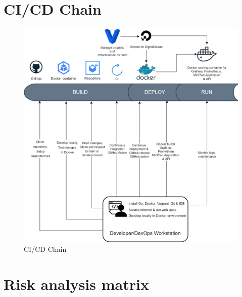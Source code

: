 \appendix

\section{CI/CD Chain}
\label{app:cicd}

\begin{figure}[!htb]
	\centering
	\includegraphics[width=1\textwidth]{images/cicd-chain.png}
	\caption{CI/CD Chain}
	\label{fig:cicd}
\end{figure}

\newpage
\section{Risk analysis matrix}
\label{app:riskanalysismatrix}

